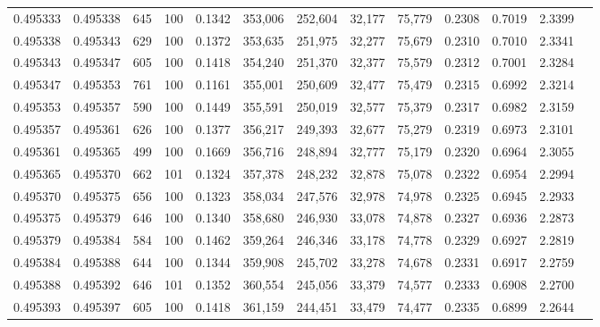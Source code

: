 \begin{tabular}{rrrrrrrrrrrrr}
0.495333 & 0.495338 &   645 & 100 &                                     0.1342 & 353,006 & 252,604 &  32,177 &  75,779 & 0.2308 & 0.7019 & 2.3399 \\
0.495338 & 0.495343 &   629 & 100 &                                     0.1372 & 353,635 & 251,975 &  32,277 &  75,679 & 0.2310 & 0.7010 & 2.3341 \\
0.495343 & 0.495347 &   605 & 100 &                                     0.1418 & 354,240 & 251,370 &  32,377 &  75,579 & 0.2312 & 0.7001 & 2.3284 \\
0.495347 & 0.495353 &   761 & 100 &                                     0.1161 & 355,001 & 250,609 &  32,477 &  75,479 & 0.2315 & 0.6992 & 2.3214 \\
0.495353 & 0.495357 &   590 & 100 &                                     0.1449 & 355,591 & 250,019 &  32,577 &  75,379 & 0.2317 & 0.6982 & 2.3159 \\
0.495357 & 0.495361 &   626 & 100 &                                     0.1377 & 356,217 & 249,393 &  32,677 &  75,279 & 0.2319 & 0.6973 & 2.3101 \\
0.495361 & 0.495365 &   499 & 100 &                                     0.1669 & 356,716 & 248,894 &  32,777 &  75,179 & 0.2320 & 0.6964 & 2.3055 \\
0.495365 & 0.495370 &   662 & 101 &                                     0.1324 & 357,378 & 248,232 &  32,878 &  75,078 & 0.2322 & 0.6954 & 2.2994 \\
0.495370 & 0.495375 &   656 & 100 &                                     0.1323 & 358,034 & 247,576 &  32,978 &  74,978 & 0.2325 & 0.6945 & 2.2933 \\
0.495375 & 0.495379 &   646 & 100 &                                     0.1340 & 358,680 & 246,930 &  33,078 &  74,878 & 0.2327 & 0.6936 & 2.2873 \\
0.495379 & 0.495384 &   584 & 100 &                                     0.1462 & 359,264 & 246,346 &  33,178 &  74,778 & 0.2329 & 0.6927 & 2.2819 \\
0.495384 & 0.495388 &   644 & 100 &                                     0.1344 & 359,908 & 245,702 &  33,278 &  74,678 & 0.2331 & 0.6917 & 2.2759 \\
0.495388 & 0.495392 &   646 & 101 &                                     0.1352 & 360,554 & 245,056 &  33,379 &  74,577 & 0.2333 & 0.6908 & 2.2700 \\
0.495393 & 0.495397 &   605 & 100 &                                     0.1418 & 361,159 & 244,451 &  33,479 &  74,477 & 0.2335 & 0.6899 & 2.2644 \\

\end{tabular}

